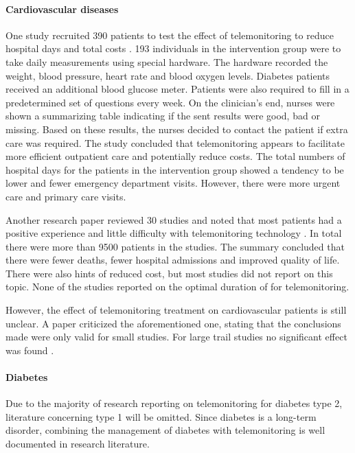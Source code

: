         \paragraph{Cardiovascular diseases} One study recruited 390 patients to test the effect of telemonitoring to reduce hospital days and total costs \cite{tompkins2010randomized}. 193 individuals in the intervention group were to take daily measurements using special hardware. The hardware recorded the weight, blood pressure, heart rate and blood oxygen levels. Diabetes patients received an additional blood glucose meter. Patients were also required to fill in a predetermined set of questions every week. On the clinician's end, nurses were shown a summarizing table indicating if the sent results were good, bad or missing. Based on these results, the nurses decided to contact the patient if extra care was required. The study concluded that telemonitoring appears to facilitate more efficient outpatient care and potentially reduce costs. The total numbers of hospital days for the patients in the intervention group showed a tendency to be lower and fewer emergency department visits. However, there were more urgent care and primary care visits.

        Another research paper reviewed 30 studies and noted that most patients had a positive experience and little difficulty with telemonitoring technology \cite{inglis2010structured}. In total there were more than 9500 patients in the studies. The summary concluded that there were fewer deaths, fewer hospital admissions and improved quality of life. There were also hints of reduced cost, but most studies did not report on this topic. None of the studies reported on the optimal duration of for telemonitoring.
        
        However, the effect of telemonitoring treatment on cardiovascular patients is still unclear. A paper criticized the aforementioned one, stating that the conclusions made were only valid for small studies. For large trail studies no significant effect was found \cite{chaudhry2010telemonitoring}.

        \paragraph{Diabetes} Due to the majority of research reporting on telemonitoring for diabetes type 2, literature concerning type 1 will be omitted. Since diabetes is a long-term disorder, combining the management of diabetes with telemonitoring is well documented in research literature.

